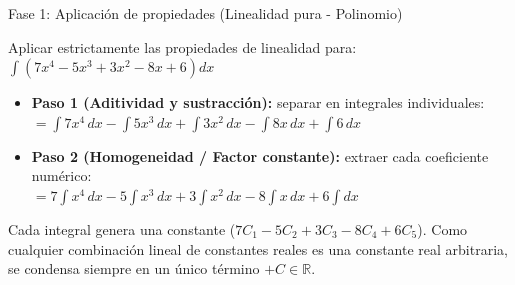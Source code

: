 \documentclass[aspectratio=169,11pt]{beamer}
\begin{document}
\begin{frame}{Fase 1: Aplicación de propiedades (Linealidad pura - Polinomio)}
\footnotesize
\begin{examplebox}[title=Ejemplo guiado 1: Descomposición formal de un polinomio, top=3pt,bottom=3pt]
\footnotesize
Aplicar estrictamente las propiedades de linealidad para: \quad $\displaystyle\int \left( 7x^4 - 5x^3 + 3x^2 - 8x + 6 \right) dx$
\begin{itemize}[itemsep=3pt]
  \item \textbf{Paso 1 (Aditividad y sustracción):} separar en integrales individuales:
  \\[2pt]
  $\displaystyle = \int 7x^4\,dx - \int 5x^3\,dx + \int 3x^2\,dx - \int 8x\,dx + \int 6\,dx$
  \item \textbf{Paso 2 (Homogeneidad / Factor constante):} extraer cada coeficiente numérico:
  \\[2pt]
  $\displaystyle = 7\int x^4\,dx - 5\int x^3\,dx + 3\int x^2\,dx - 8\int x\,dx + 6\int dx$
\end{itemize}
\end{examplebox}
\vspace{0.04cm}
\begin{keybox}[title=Justificación de la constante única $C$, top=2pt,bottom=2pt]
\scriptsize
Cada integral genera una constante ($7C_1 - 5C_2 + 3C_3 - 8C_4 + 6C_5$). Como cualquier combinación lineal de constantes reales es una constante real arbitraria, se condensa siempre en un único término $+C \in \mathbb{R}$.
\end{keybox}
\end{frame}
\end{document}
